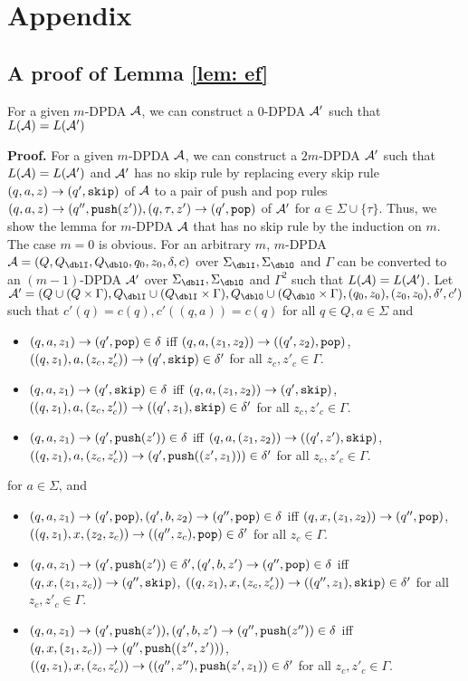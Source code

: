 \appendix
\section{Appendix}

\subsection{A proof of Lemma \ref{lem: ef}}
\setcounter{lemma}{\ref{lem: ef}}
\addtocounter{lemma}{-1}
\begin{lemma}
For a given $m$-DPDA ${\cal A}$,
we can construct a $0$-DPDA ${\cal A}'$ such that
$L({\cal A})=L({\cal A}')$
\end{lemma}
{\bf Proof.}\quad
For a given $m$-DPDA ${\cal A}$,
we can construct a $2m$-DPDA ${\cal A}'$ such that
$L({\cal A})=L({\cal A}')$ and
${\cal A}'$ has no skip rule
by replacing every skip rule $(q,a,z)\to (q',\mathtt{skip})$ of ${\cal A}$
to a pair of push and pop rules
$(q,a,z)\to(q'',\mathtt{push}(z')), (q,\tau,z')\to(q',\mathtt{pop})$ of ${\cal A}'$
for $a\in \Sigma\cup\{\tau\}$.
Thus, we show the lemma for $m$-DPDA ${\cal A}$ that has no skip rule
by the induction on $m$.
The case $m=0$ is obvious.
For an arbitrary $m$,
$m$-DPDA $\calA=(Q, Q_\dblI, Q_\dblO, q_0,z_0,\delta,c)$
over $\Sigma_\dblI, \Sigma_\dblO$ and $\Gamma$
can be converted to an
$(m-1)$-DPDA ${\cal A}'$
over $\Sigma_\dblI, \Sigma_\dblO$ and $\Gamma^2$
such that $L({\cal A})=L({\cal A}')$.
Let $\calA'=(Q\cup(Q\times\Gamma), Q_\dblI\cup(Q_\dblI\times\Gamma), Q_\dblO\cup(Q_\dblO\times\Gamma), (q_0,z_0), (z_0,z_0),\delta',c')$
such that
$c'(q)=c(q), c'((q,a))=c(q)$ for all $q\in Q, a\in\Sigma$ and
\begin{itemize}
\item
$(q,a,z_1)\to (q',\mathtt{pop})\in\delta$
iff
$(q,a,(z_1,z_2))\to ((q',z_2),\mathtt{pop})$,
$((q,z_1),a,(z_c,z'_c))\to (q',\mathtt{skip})\in\delta'$
for all $z_c,z'_c\in\Gamma$.
\item
$(q,a,z_1)\to (q',\mathtt{skip})\in\delta$
iff
$(q,a,(z_1,z_2))\to (q',\mathtt{skip})$,
$((q,z_1),a,(z_c,z'_c))\to ((q',z_1),\mathtt{skip})\in\delta'$
for all $z_c,z'_c\in\Gamma$.
\item
$(q,a,z_1)\to (q',\mathtt{push}(z'))\in\delta$
iff
$(q,a,(z_1,z_2))\to ((q',z'),\mathtt{skip})$,
$((q,z_1),a,(z_c,z'_c))\to (q',\mathtt{push}((z',z_1)))\in\delta'$
for all $z_c,z'_c\in\Gamma$.
\end{itemize}
for $a\in\Sigma$, and
\begin{itemize}
\item
$(q,a,z_1)\to (q',\mathtt{pop}), (q',b,z_2)\to (q'',\mathtt{pop})\in\delta$
iff
$(q,x,(z_1,z_2))\to (q'',\mathtt{pop})$,
$((q,z_1),x,(z_2,z_c))\to ((q'',z_c),\mathtt{pop})\in\delta'$
for all $z_c\in\Gamma$.
\item
$(q,a,z_1)\to (q',\mathtt{push}(z'))\in\delta', (q',b,z')\to (q'',\mathtt{pop})\in\delta$
iff
$(q,x,(z_1,z_c))\to (q'',\mathtt{skip})$,
$((q,z_1),x,(z_c,z'_c))\to ((q'',z_1),\mathtt{skip})\in\delta'$
for all $z_c, z'_c\in\Gamma$.
\item
$(q,a,z_1)\to (q',\mathtt{push}(z')), (q',b,z')\to (q'',\mathtt{push}(z''))\in\delta$
iff
$(q,x,(z_1,z_c))\to (q'',\mathtt{push}((z'',z')))$,
$((q,z_1),x,(z_c,z'_c))\to ((q'',z''),\mathtt{push}(z',z_1))\in\delta'$
for all $z_c, z'_c\in\Gamma$.
\end{itemize}
